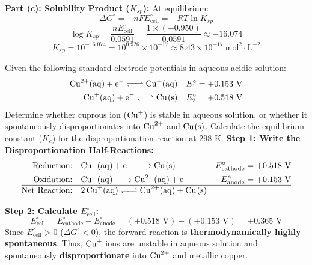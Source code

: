 \begin{examplebox}
\textbf{Part (c): Solubility Product ($K_{sp}$):}
At equilibrium:
\begin{equation*}
    \Delta G^\circ = -n F E^\circ_{\text{cell}} = -RT \ln K_{sp}
\end{equation*}
\begin{equation*}
    \log K_{sp} = \frac{n E^\circ_{\text{cell}}}{0.0591} = \frac{1 \times (-0.950)}{0.0591} \approx -16.074
\end{equation*}
\begin{equation*}
    K_{sp} = 10^{-16.074} = 10^{0.926} \times 10^{-17} \approx 8.43 \times 10^{-17}\ \text{mol}^2\cdot\text{L}^{-2}
\end{equation*}
\end{examplebox}

\begin{examplebox}
Given the following standard electrode potentials in aqueous acidic solution:
\begin{align*}
    \ce{Cu^2+(aq) + e^- <=> Cu+(aq)} \quad & E^\circ_1 = +0.153\text{ V} \\
    \ce{Cu+(aq) + e^- <=> Cu(s)} \quad & E^\circ_2 = +0.518\text{ V}
\end{align*}
Determine whether cuprous ion ($\ce{Cu+}$) is stable in aqueous solution, or whether it spontaneously disproportionates into $\ce{Cu^2+}$ and $\ce{Cu(s)}$. Calculate the equilibrium constant ($K_c$) for the disproportionation reaction at $298\text{ K}$.
\tcblower
\textbf{Step 1: Write the Disproportionation Half-Reactions:}
\begin{align*}
    \text{Reduction:} \quad & \ce{Cu+(aq) + e^- -> Cu(s)} \quad & E^\circ_{\text{cathode}} = +0.518\text{ V} \\
    \text{Oxidation:} \quad & \ce{Cu+(aq) -> Cu^2+(aq) + e^-} \quad & E^\circ_{\text{anode}} = +0.153\text{ V} \\
    \hline
    \text{Net Reaction:} \quad & \ce{2Cu+(aq) <=> Cu^2+(aq) + Cu(s)} &
\end{align*}

\textbf{Step 2: Calculate $E^\circ_{\text{cell}}$:}
\begin{equation*}
    E^\circ_{\text{cell}} = E^\circ_{\text{cathode}} - E^\circ_{\text{anode}} = (+0.518\text{ V}) - (+0.153\text{ V}) = +0.365\text{ V}
\end{equation*}
Since $E^\circ_{\text{cell}} > 0$ ($\Delta G^\circ < 0$), the forward reaction is \textbf{thermodynamically highly spontaneous}. Thus, $\ce{Cu+}$ ions are unstable in aqueous solution and spontaneously \textbf{disproportionate} into $\ce{Cu^2+}$ and metallic copper.


\end{examplebox}
